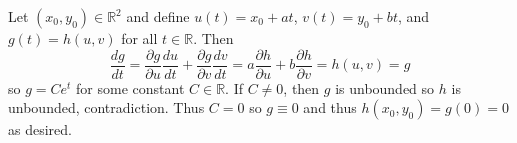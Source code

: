 Let $(x_0,y_0)\in\mathbb{R}^2$ and define $u(t)=x_0+at$, $v(t)=y_0+bt$, and $g(t)=h(u,v)$ for all $t\in\mathbb{R}$. Then
\[
	\frac{dg}{dt}=\frac{\partial g}{\partial u}\frac{du}{dt}+\frac{\partial g}{\partial v}\frac{dv}{dt}=a\frac{\partial h}{\partial u}+b\frac{\partial h}{\partial v}=h(u,v)=g
\]
so $g=Ce^t$ for some constant $C\in\mathbb{R}$. If $C\neq0$, then $g$ is unbounded so $h$ is unbounded, contradiction. Thus $C=0$ so $g\equiv0$ and thus $h(x_0,y_0)=g(0)=0$ as desired.